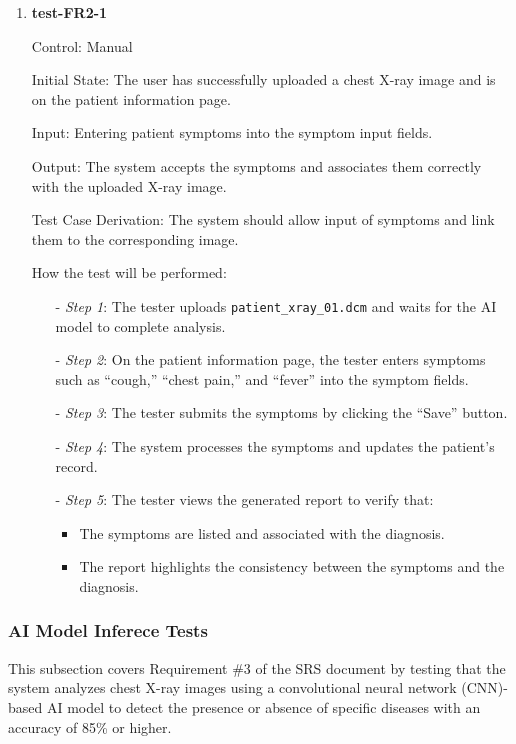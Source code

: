\documentclass[12pt, titlepage]{article}
\begin{document}
\begin{enumerate}

\item \textbf{test-FR2-1} \label{test-FR2-1}

Control: Manual

Initial State: The user has successfully uploaded a chest X-ray image and is on the patient information page.

Input: Entering patient symptoms into the symptom input fields.

Output: The system accepts the symptoms and associates them correctly with the uploaded X-ray image.

Test Case Derivation: The system should allow input of symptoms and link them to the corresponding image.

How the test will be performed: 
\begin{itemize}
  \item[-] \textit{Step 1}: The tester uploads \texttt{patient\_xray\_01.dcm} and waits for the AI model to complete analysis.
  \item[-] \textit{Step 2}: On the patient information page, the tester enters symptoms such as  ``cough,'' ``chest pain,'' and ``fever'' into the symptom fields.
  \item[-] \textit{Step 3}: The tester submits the symptoms by clicking the ``Save'' button.
  \item[-] \textit{Step 4}: The system processes the symptoms and updates the patient's record.
  \item[-] \textit{Step 5}: The tester views the generated report to verify that:
    \begin{itemize}
      \item The symptoms are listed and associated with the diagnosis.
      \item The report highlights the consistency between the symptoms and the diagnosis.
    \end{itemize}
  \end{itemize}

\end{enumerate}

\subsubsection{AI Model Inferece Tests}

This subsection covers Requirement \#3 of the SRS document by testing that the system analyzes chest X-ray images using a convolutional neural network (CNN)-based AI model to detect the presence or absence of specific diseases with an accuracy of 85\% or higher.
\end{document}
